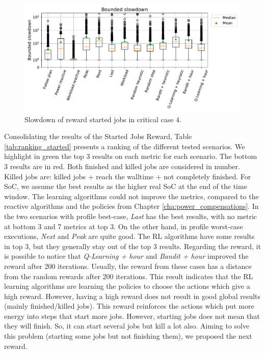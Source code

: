 \begin{figure}[!htb]
    \centering
    \includegraphics[scale=0.5]{Images/Learning_compensations/slowdown.pdf}
    \caption{Slowdown of reward started jobs in critical case 4.}
    \label{fig:slowdown_results_critical_4}
\end{figure}

Consolidating the results of the Started Jobs Reward, Table \ref{tab:ranking_started} presents a ranking of the different tested scenarios. We highlight in green the top 3 results on each metric for each scenario. The bottom 3 results are in red. Both finished and killed jobs are considered in number. Killed jobs are: killed jobs + reach the walltime + not completely finished. For SoC, we assume the best results as the higher real SoC at the end of the time window. The learning algorithms could not improve the metrics, compared to the reactive algorithms and the policies from Chapter \ref{cha:power_compensations}. In the two scenarios with profile best-case, \emph{Last} has the best results, with no metric at bottom 3 and 7 metrics at top 3. On the other hand, in profile worst-case executions, \emph{Next} and \emph{Peak} are quite good. The RL algorithms have some results in top 3, but they generally stay out of the top 3 results. Regarding the reward, it is possible to notice that \emph{Q-Learning + hour} and \emph{Bandit + hour} improved the reward after 200 iterations. Usually, the reward from these cases has a distance from the random rewards after 200 iterations. This result indicates that the RL learning algorithms are learning the policies to choose the actions which give a high reward. However, having a high reward does not result in good global results (mainly finished/killed jobs). This reward reinforces the actions which put more energy into steps that start more jobs. However, starting jobs does not mean that they will finish. So, it can start several jobs but kill a lot also. Aiming to solve this problem (starting some jobs but not finishing them), we proposed the next reward.

